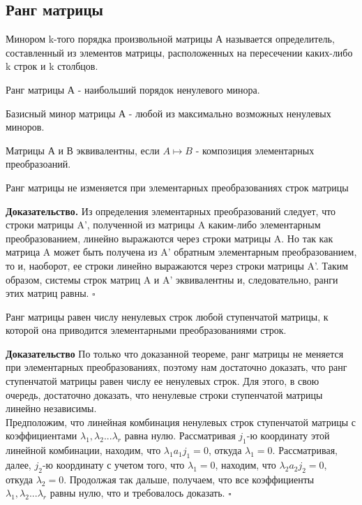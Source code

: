 \subsection{Ранг матрицы}
\begin{defin}
Минором k-того порядка произвольной матрицы А называется определитель, 
составленный из элементов матрицы, расположенных на пересечении каких-либо 
k строк и k столбцов.
\end{defin}
\begin{defin}
Ранг матрицы А - наибольший порядок ненулевого минора.
\end{defin}
\begin{defin}
Базисный минор матрицы А - любой из максимально возможных ненулевых миноров.
\end{defin}
\begin{defin}
Матрицы А и В эквивалентны, если $A \mapsto B$ - композиция элементарных 
преобразоаний. 
\end{defin}

\begin{theor}\label{rgconst}
Ранг матрицы не изменяется при элементарных преобразованиях строк матрицы
\end{theor}
\textbf{Доказательство.} Из определения элементарных преобразований следует,
что строки матрицы A’, полученной из матрицы A каким-либо элементарным 
преобразованием, линейно выражаются через строки матрицы A. Но так как матрица
A может быть получена из A’ обратным
элементарным преобразованием, то и, наоборот, ее строки линейно выражаются 
через строки матрицы A’. Таким образом, системы
строк матриц A и A’ эквивалентны и, следовательно, ранги этих
матриц равны. $\square$
\begin{theor}\label{rang}
Ранг матрицы равен числу ненулевых строк любой ступенчатой матрицы, к которой
она приводится элементарными преобразованиями строк.
\end{theor}
\textbf{Доказательство} По только что доказанной теореме, ранг матрицы не 
меняется при элементарных преобразованиях, поэтому нам достаточно доказать, 
что ранг ступенчатой матрицы равен числу ее ненулевых строк. Для этого,
в свою очередь, достаточно доказать, что ненулевые строки ступенчатой матрицы
линейно независимы.\\
Предположим, что линейная комбинация ненулевых строк ступенчатой матрицы с 
коэффициентами $\lambda_1, \lambda_2...\lambda_r$ равна нулю. Рассматривая
$j_1$-ю координату этой линейной комбинации, находим, что $\lambda_1a_1j_1 = 0$,
откуда $\lambda_1 = 0$. Рассматривая, далее, $j_2$-ю координату с учетом того,
что $\lambda_1 = 0$, находим, что $\lambda_2a_2j_2 = 0$, откуда
$\lambda_2 = 0$. Продолжая так дальше, получаем, что все коэффициенты 
$\lambda_1, \lambda_2...\lambda_r$ равны нулю, что и требовалось доказать.
$\square$

